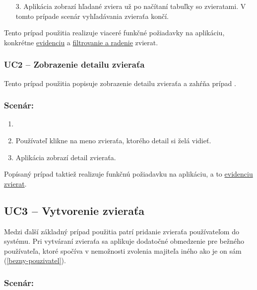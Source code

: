 \begin{enumerate}
    \item [3.] Aplikácia zobrazí hľadané zviera už po načítaní tabuľky so zvieratami. V tomto prípade scenár vyhľadávania zvieraťa končí.
\end{enumerate}

Tento prípad použitia realizuje viaceré funkčné požiadavky na aplikáciu, konkrétne \hyperref[evidencia-zvierat]{evidenciu} a \hyperref[filtrovanie-a-radenie]{filtrovanie a radenie} zvierat.

\subsubsection*{UC2 -- Zobrazenie detailu zvieraťa}\label{uc2}

Tento prípad použitia popisuje zobrazenie detailu zvieraťa a zahŕňa prípad .

\subsubsection*{Scenár:}

\begin{enumerate}
	\item {}
	\item Používateľ klikne na meno zvieraťa, ktorého detail si želá vidieť.
	\item Aplikácia zobrazí detail zvieraťa.
\end{enumerate}

Popísaný prípad taktiež realizuje funkčnú požiadavku na aplikáciu, a to \hyperref[evidencia-zvierat]{evidenciu zvierat}.

\subsection*{UC3 -- Vytvorenie zvieraťa}

Medzi ďalší základný prípad použitia patrí pridanie zvieraťa používateľom do systému.
Pri vytváraní zvieraťa sa aplikuje dodatočné obmedzenie pre bežného používateľa, ktoré spočíva v nemožnosti zvolenia majiteľa iného ako je on sám (\ref{bezny-pouzivatel}).

\subsubsection*{Scenár:}

